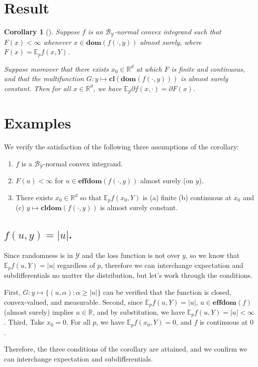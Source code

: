 \documentclass[12pt]{article}
\newcommand{\reals}{\mathbb{R}}
\newcommand{\B}{\mathcal{B}}
\newcommand{\E}{\mathbb{E}}
\newcommand{\Y}{\mathcal{Y}}
\newcommand{\cl}{\mathbf{cl}}
\newcommand{\dom}{\mathbf{dom}}
\newcommand{\effdom}{\mathbf{effdom}}
\newtheorem{corollary}{Corollary}
\begin{document}
\section{Result}
\begin{corollary}[\cite{rockafellar1982interchange,ioffe1969minimization}]
	Suppose $f$ is an $\B_\Y$-normal convex integrand such that $F(x) < \infty$ whenever $x \in \dom(f(\cdot,y))$ almost surely, where $F(x) = \E_p f(x,Y)$.
	
	Suppose moreover that there exists $x_0 \in \reals^d$ at which $F$ is finite and continuous, and that the multifunction $G: y \mapsto \cl(\dom(f(\cdot,y)))$ is almost surely constant.
	Then for all $x \in \reals^d$, we have $\E_p \partial f(x, \cdot) = \partial F(x)$.
\end{corollary}


\section{Examples}
We verify the satisfaction of the following three assumptions of the corollary:
\begin{enumerate}
	\item $f$ is a $\B_\Y$-normal convex integrand.
	\item $F(u) < \infty$ for $u \in \effdom(f(\cdot,y))$ almost surely (on $y$).
	\item There exists $x_0 \in \reals^d$ so that $\E_p f(x_0, Y)$ is (a) finite (b) continuous at $x_0$ and (c) $y \mapsto \cl \dom (f(\cdot, y))$ is almost surely constant.
\end{enumerate}
\subsection{$f(u,y) = |u|$.}

Since randomness is in $\Y$ and the loss function is not over $y$, so we know that $\E_p f(u,Y) = |u|$ regardless of $p$, therefore we can interchange expectation and subdifferentials no matter the distribution, but let's work through the conditions.

First, $G : y \mapsto \{(u,\alpha) : \alpha \geq |u| \}$ can be verified that the function is closed, convex-valued, and measurable.
Second, since $\E_p f(u,Y) = |u|$, $u \in \effdom(f)$ (almost surely) implies $u \in \reals$, and by substitution, we have $\E_p f(u,Y) = |u| < \infty$.
Third, Take $x_0 = 0$.  For all $p$, we have $\E_p f(x_0, Y) = 0$, and $f$ is continuous at $0$.

Therefore, the three conditions of the corollary are attained, and we confirm we can interchange expectation and subdifferentials.
\end{document}
